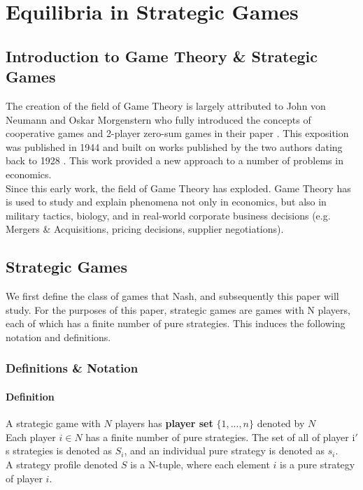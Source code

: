 \documentclass[12pt]{article}
\newcommand{\Definition}{\paragraph{Definition}}
\begin{document}
	\section{Equilibria in Strategic Games\cite{28}}

	\subsection{Introduction to Game Theory \& Strategic Games}
	The creation of the field of Game Theory is largely attributed to John von Neumann and Oskar Morgenstern who fully introduced the concepts of cooperative games and 2-player zero-sum games in their paper \cite{26} . This exposition was published in 1944 and built on works published by the two authors dating back to 1928 \cite{27}. This work provided a new approach to a number of problems in economics. \\
	
	Since this early work, the field of Game Theory has exploded. Game Theory has is used to study and explain phenomena not only in economics, but also in military tactics, biology, and in real-world corporate business decisions (e.g. Mergers \& Acquisitions, pricing decisions, supplier negotiations).
	
	\subsection{Strategic Games}
	
	We first define the class of games that Nash, and subsequently this paper will study. For the purposes of this paper, strategic games are games with N players, each of which has a finite number of pure strategies. This induces the following notation and definitions.
	
	\subsubsection{Definitions \& Notation}
	
	\Definition A strategic game with $N$ players has \textbf{player set} $\{1,...,n\}$ denoted by $N$\\
	
	Each player $i \in N$ has a finite number of pure strategies. The set of all of player i$'$s strategies is denoted as $S_i$, and an individual pure strategy is denoted as $s_i$.\\
	
	A strategy profile denoted $S$ is a N-tuple, where each element $i$ is a pure strategy of player $i$.\\
	
\end{document}
